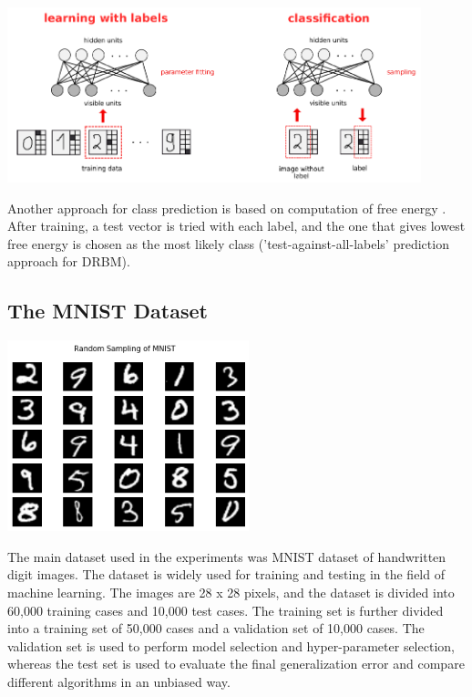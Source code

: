 \documentclass[a4paper]{scrartcl}
\begin{document}
\begin{center}
\includegraphics[width=12cm]{images/DRBM.png}
\end{center}
Another approach for class prediction is based on computation of free energy \cite{Hinton}. After training, a test vector is tried with each label, and the one that gives lowest free energy is chosen as the most likely class ('test-against-all-labels' prediction approach for DRBM).



\subsection{The MNIST Dataset} %
\begin{minipage}[t]{0.5\textwidth}
\includegraphics[width=7cm]{images/mnist-example.png}
\end{minipage}
\par The main dataset used in the experiments was MNIST dataset of handwritten digit images. The dataset is widely used for training and testing in the field of machine learning. The images are 28 x 28 pixels, and the dataset is divided into 60,000 training cases and 10,000 test cases. The training set is further divided into a training set of 50,000 cases and a validation set of 10,000 cases. The validation set is used to perform model selection and hyper-parameter selection, whereas the test set is used to evaluate the final generalization error and compare different algorithms in an unbiased way.
\end{document}
